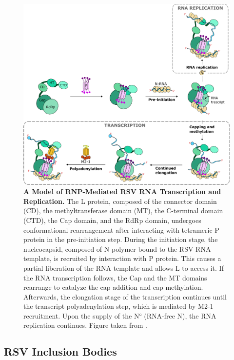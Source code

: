 \begin{figure}
    \centering
    \includegraphics[width=1\linewidth]{04. Introduction//Figs/09. N_p_l_m21-interaction-overview.pdf}  
    \caption[A Model of RNP-Mediated RSV RNA Transcription and Replication.]{\textbf{A Model of RNP-Mediated RSV RNA Transcription and Replication.} The L protein, composed of the connector domain (CD), the methyltransferase domain (MT), the C-terminal domain (CTD), the Cap domain, and the RdRp domain, undergoes conformational rearrangement after interacting with tetrameric P protein in the pre-initiation step. During the initiation stage, the nucleocapsid, composed of N polymer bound to the RSV RNA template, is recruited by interaction with P protein. This causes a partial liberation of the RNA template and allows L to access it. If the RNA transcription follows, the Cap and the MT domains rearrange to catalyze the cap addition and cap methylation. Afterwards, the elongation stage of the transcription continues until the transcript polyadenylation step, which is mediated by M2-1 recruitment. Upon the supply of the N° (RNA-free N), the RNA replication continues. Figure taken from \cite{Cao2021StructuralComplexes}.}
    \label{fig:A Model of RNP-Mediated RSV RNA Transcription and Replication}
\end{figure}



\subsection{RSV Inclusion Bodies} \label{subsec:RSV Inclusion Bodies}


